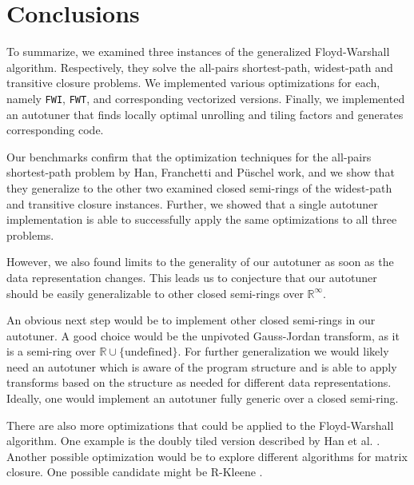 \section{Conclusions}
To summarize, we examined three instances of the generalized Floyd-Warshall algorithm. Respectively, they solve the all-pairs shortest-path, widest-path and transitive closure problems. We implemented various optimizations for each, namely \texttt{FWI}, \texttt{FWT}, and corresponding vectorized versions.
Finally, we implemented an autotuner that finds locally optimal unrolling and tiling factors and generates corresponding code.

Our benchmarks confirm that the optimization techniques for the all-pairs shortest-path problem by Han, Franchetti and Püschel \cite{han06generation} work, and we show that they generalize to the other two examined closed semi-rings of the widest-path and transitive closure instances. Further, we showed that a single autotuner implementation is
able to successfully apply the same optimizations to all three problems.

However, we also found limits to the generality of our autotuner as soon as the data representation changes.
This leads us to conjecture that our autotuner should be easily generalizable to other closed semi-rings over
$\mathbb{R}^\infty$.

An obvious next step would be to implement other closed semi-rings in our autotuner. A good choice would be
the unpivoted Gauss-Jordan transform, as it is a semi-ring over $\mathbb{R}\cup\{\text{undefined}\}$. For further
generalization we would likely need an autotuner which is aware of the program structure and is able to apply
transforms based on the structure as needed for different data representations. Ideally, one would implement
an autotuner fully generic over a closed semi-ring.

There are also more optimizations that could be applied to the Floyd-Warshall algorithm. One example is the
doubly tiled version described by Han et al. \cite{han06generation}. Another possible optimization would be
to explore different algorithms for matrix closure. One possible candidate might be R-Kleene 
\cite{dalberto2007r-kleene}.
